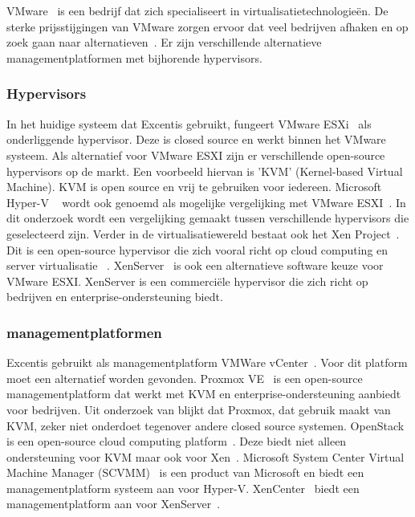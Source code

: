 \chapter{}%
\label{ch:stand-van-zaken}


VMware~\autocite{vmware} is een bedrijf dat zich specialiseert in virtualisatietechnologieën. De sterke prijsstijgingen van VMware zorgen ervoor dat veel bedrijven afhaken en op zoek gaan naar alternatieven~\autocite{Hale2024}. Er zijn verschillende alternatieve managementplatformen met bijhorende hypervisors.

\subsection{Hypervisors}
In het huidige systeem dat Excentis gebruikt, fungeert VMware ESXi~\autocite{vmware} als onderliggende hypervisor. Deze is closed source en werkt binnen het VMware systeem. Als alternatief voor VMware ESXI zijn er verschillende open-source hypervisors op de markt.
Een voorbeeld hiervan is 'KVM' (Kernel-based Virtual Machine)\autocite{KVM}. KVM is open source en vrij te gebruiken voor iedereen\autocite{KVM}. Microsoft Hyper-V ~\autocite{Eaton2019} wordt ook genoemd als mogelijke vergelijking met VMware ESXI~\autocite{fayyad2013benchmarking}. In dit onderzoek wordt een vergelijking gemaakt tussen verschillende hypervisors die geselecteerd zijn.
Verder in de virtualisatiewereld bestaat ook het Xen Project~\autocite{xenproject}. Dit is een open-source hypervisor die zich vooral richt op cloud computing en server virtualisatie ~\autocite{binu2011virtualization}.
XenServer~\autocite{xenserverwebsite} is ook een alternatieve software keuze voor VMware ESXI. XenServer is een commerciële hypervisor die zich richt op bedrijven en enterprise-ondersteuning biedt.
 
\subsection{managementplatformen}
Excentis gebruikt als managementplatform VMWare vCenter~\autocite{vmware}. Voor dit platform moet een alternatief worden gevonden.
Proxmox VE~\autocite{Proxmox} is een open-source managementplatform dat werkt met KVM en enterprise-ondersteuning aanbiedt voor bedrijven. Uit onderzoek van \textcite{ally2018comparative} blijkt dat Proxmox, dat gebruik maakt van KVM, zeker niet onderdoet tegenover andere closed source systemen.
OpenStack is een open-source cloud computing platform~\autocite{openstack2024}. Deze biedt niet alleen ondersteuning voor KVM maar ook voor Xen~\autocite{oleksiuk2023comparative}.
Microsoft System Center Virtual Machine Manager (SCVMM)~\autocite{microsoftvmm2025} is een product van Microsoft en biedt een managementplatform systeem aan voor Hyper-V.
XenCenter~\autocite{xencenter2024} biedt een managementplatform aan voor XenServer~\autocite{xenserverwebsite}.


